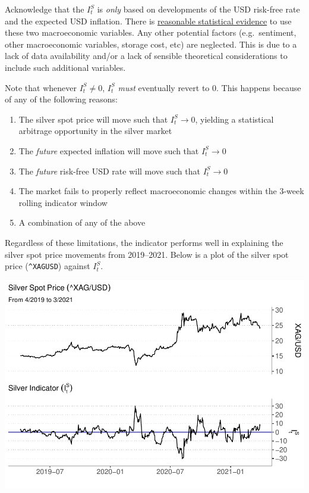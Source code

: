\documentclass[
  12pt,
]{article}
\providecommand{\tightlist}{%
  \setlength{\itemsep}{0pt}\setlength{\parskip}{0pt}}
\begin{document}
Acknowledge that the \(I^S_t\) is \emph{only} based on developments of
the USD risk-free rate and the expected USD inflation. There is
\protect\hyperlink{empirical-validation}{reasonable statistical
evidence} to use these two macroeconomic variables. Any other potential
factors (e.g.~sentiment, other macroeconomic variables, storage cost,
etc) are neglected. This is due to a lack of data availability and/or a
lack of sensible theoretical considerations to include such additional
variables.

Note that whenever \(I^S_t \neq 0\), \(I^S_t\) \emph{must} eventually
revert to \(0\). This happens because of any of the following reasons:

\begin{enumerate}
\def\labelenumi{\alph{enumi}.}
\tightlist
\item
  The silver spot price will move such that \(I^S_t \to 0\), yielding a
  statistical arbitrage opportunity in the silver market
\item
  The \emph{future} expected inflation will move such that
  \(I^S_t \to 0\)
\item
  The \emph{future} risk-free USD rate will move such that
  \(I^S_t \to 0\)
\item
  The market fails to properly reflect macroeconomic changes within the
  3-week rolling indicator window
\item
  A combination of any of the above
\end{enumerate}

Regardless of these limitations, the indicator performs well in
explaining the silver spot price movements from 2019--2021. Below is a
plot of the silver spot price (\texttt{\^{}XAGUSD}) against \(I^S_t\).

\includegraphics{silver-market-timing_files/figure-latex/silver-indicator-1.pdf}
\end{document}
